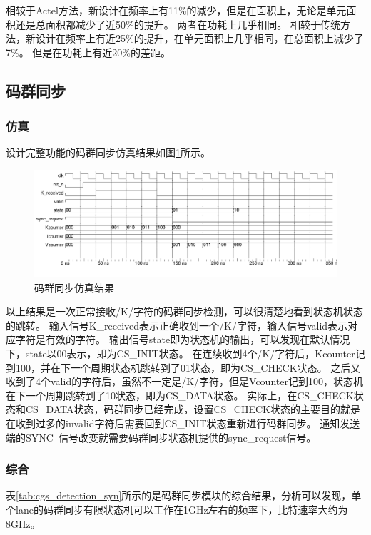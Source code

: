 \documentclass[UTF8]{ctexart}
\begin{document}
相较于Actel方法，新设计在频率上有11\%的减少，但是在面积上，无论是单元面积还是总面积都减少了近50\%的提升。
两者在功耗上几乎相同。
相较于传统方法，新设计在频率上有近25\%的提升，在单元面积上几乎相同，在总面积上减少了7\%。
但是在功耗上有近20\%的差距。

\subsection{码群同步}

\subsubsection{仿真}

设计完整功能的码群同步仿真结果如图\ref{fig:cgs_detection_wave}所示。

\begin{figure}[H]
	\centering
	\includegraphics[width=18cm]{./img/cgs_detection_wave.pdf}
	\caption{码群同步仿真结果}
	\label{fig:cgs_detection_wave}
\end{figure}

以上结果是一次正常接收/K/字符的码群同步检测，可以很清楚地看到状态机状态的跳转。
输入信号K\_received表示正确收到一个/K/字符，输入信号valid表示对应字符是有效的字符。
输出信号state即为状态机的输出，可以发现在默认情况下，state以00表示，即为CS\_INIT状态。
在连续收到4个/K/字符后，Kcounter记到100，并在下一个周期状态机跳转到了01状态，即为CS\_CHECK状态。
之后又收到了4个valid的字符后，虽然不一定是/K/字符，但是Vcounter记到100，状态机在下一个周期跳转到了10状态，即为CS\_DATA状态。
实际上，在CS\_CHECK状态和CS\_DATA状态，码群同步已经完成，设置CS\_CHECK状态的主要目的就是在收到过多的invalid字符后需要回到CS\_INIT状态重新进行码群同步。
通知发送端的SYNC~信号改变就需要码群同步状态机提供的sync\_request信号。

\subsubsection{综合}

表\ref{tab:cgs_detection_syn}所示的是码群同步模块的综合结果，分析可以发现，单个lane的码群同步有限状态机可以工作在1GHz左右的频率下，比特速率大约为8GHz。
\end{document}
